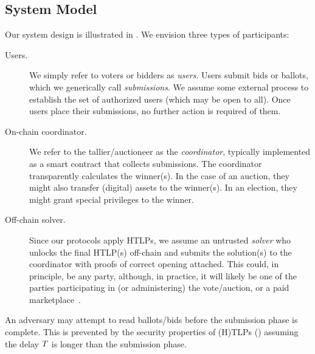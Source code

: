 \subsection{System Model}\label{sec:model}



Our system design is illustrated in . We envision three types of participants:
\begin{description}
    \item[Users.] We simply refer to voters or bidders as \emph{users}. Users submit bids or ballots, which we generically call \emph{submissions}. We assume some external process to establish the set of authorized users (which may be open to all).  Once users place their submissions, no further action is required of them. 
    \item[On-chain coordinator.] We refer to the tallier/auctioneer as the \emph{coordinator}, typically implemented as a smart contract that collects submissions. The coordinator transparently calculates the winner(s). In the case of an auction, they might also transfer (digital) assets to the winner(s). In an election, they might grant special privileges to the winner.%
    \item[Off-chain solver.] Since our protocols apply HTLPs, we assume an untrusted \emph{solver} who unlocks the final HTLP(s) off-chain and submits the solution(s) to the coordinator with proofs of correct opening attached. This could, in principle, be any party, although, in practice, it will likely be one of the parties participating in (or administering) the vote/auction, or a paid marketplace~\cite{EPRINT:Abadi23,CCS:TGBKS21}.
\end{description}

An adversary may attempt to read ballots/bids before the submission phase is complete. This is prevented by the security properties of (H)TLPs () assuming the delay $T$ is longer than the submission phase.